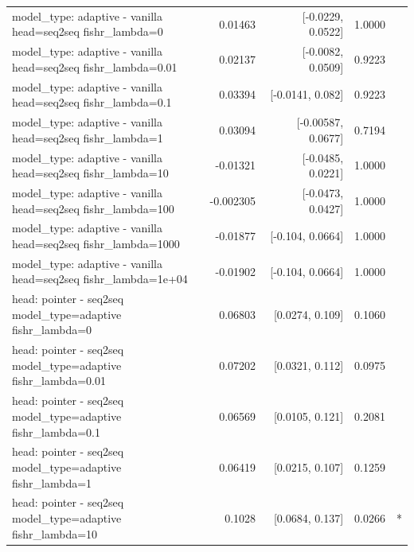 \documentclass[10pt]{article}
\makeatletter
\newcommand{\stackcell}[1]{\begin{tabular}[t]{@{}l@{}}#1\end{tabular}}
\makeatother
\begin{document}
{\begin{longtable}{lrrrl}
\stackcell{model\_type: adaptive - vanilla\\\footnotesize head=seq2seq fishr\_lambda=0 } & 0.01463 & [-0.0229, 0.0522] & 1.0000 & \\
\stackcell{model\_type: adaptive - vanilla\\\footnotesize head=seq2seq fishr\_lambda=0.01 } & 0.02137 & [-0.0082, 0.0509] & 0.9223 & \\
\stackcell{model\_type: adaptive - vanilla\\\footnotesize head=seq2seq fishr\_lambda=0.1 } & 0.03394 & [-0.0141, 0.082] & 0.9223 & \\
\stackcell{model\_type: adaptive - vanilla\\\footnotesize head=seq2seq fishr\_lambda=1 } & 0.03094 & [-0.00587, 0.0677] & 0.7194 & \\
\stackcell{model\_type: adaptive - vanilla\\\footnotesize head=seq2seq fishr\_lambda=10 } & -0.01321 & [-0.0485, 0.0221] & 1.0000 & \\
\stackcell{model\_type: adaptive - vanilla\\\footnotesize head=seq2seq fishr\_lambda=100 } & -0.002305 & [-0.0473, 0.0427] & 1.0000 & \\
\stackcell{model\_type: adaptive - vanilla\\\footnotesize head=seq2seq fishr\_lambda=1000 } & -0.01877 & [-0.104, 0.0664] & 1.0000 & \\
\stackcell{model\_type: adaptive - vanilla\\\footnotesize head=seq2seq fishr\_lambda=1e+04 } & -0.01902 & [-0.104, 0.0664] & 1.0000 & \\
\stackcell{head: pointer - seq2seq\\\footnotesize model\_type=adaptive fishr\_lambda=0 } & 0.06803 & [0.0274, 0.109] & 0.1060 & \\
\stackcell{head: pointer - seq2seq\\\footnotesize model\_type=adaptive fishr\_lambda=0.01 } & 0.07202 & [0.0321, 0.112] & 0.0975 & \\
\stackcell{head: pointer - seq2seq\\\footnotesize model\_type=adaptive fishr\_lambda=0.1 } & 0.06569 & [0.0105, 0.121] & 0.2081 & \\
\stackcell{head: pointer - seq2seq\\\footnotesize model\_type=adaptive fishr\_lambda=1 } & 0.06419 & [0.0215, 0.107] & 0.1259 & \\
\stackcell{head: pointer - seq2seq\\\footnotesize model\_type=adaptive fishr\_lambda=10 } & 0.1028 & [0.0684, 0.137] & 0.0266 & *\\

\end{longtable}}
\end{document}
